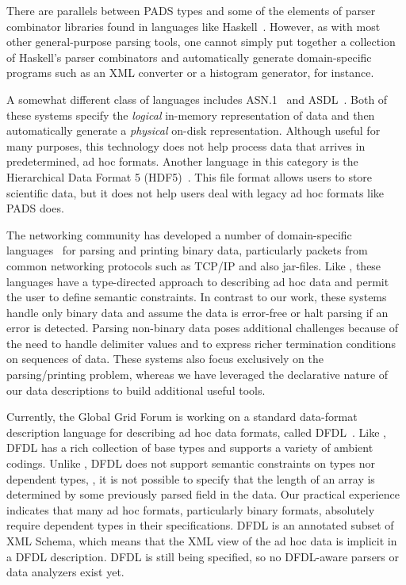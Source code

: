 \documentclass[11pt]{article}
\begin{document}
There are parallels between PADS types and some of the elements of parser
combinator libraries found in languages like
Haskell~\cite{burge:parser-combinators,hutton+:parser-combinators}. 
However, as with most other general-purpose parsing tools, one cannot
simply put together a collection of Haskell's parser combinators and
automatically generate domain-specific programs such as 
an XML converter or a histogram generator, for instance.  

A somewhat different class of languages includes
\textsc{ASN.1}~\cite{asn} and \textsc{ASDL}~\cite{asdl}. 
Both of these systems specify the {\em logical\/} in-memory representation of data
and then automatically generate a {\em physical\/} on-disk representation.
Although useful for many purposes, this technology does not help
process data that arrives in predetermined, ad hoc formats.
Another language in this category is the Hierarchical Data Format 5 
(HDF5)~\cite{hdf5}.  This file format allows users to store scientific
data, but it does not help users deal with legacy ad hoc formats like PADS does.

The networking community has developed a number of domain-specific
languages~\cite{sigcomm00,bfd,gpce02} for parsing and printing binary data, particularly packets
from common networking protocols such as \textsc{TCP/IP} and also
\java{} jar-files.  Like \pads{}, these languages have a type-directed
approach to describing ad hoc data and permit the user to define
semantic constraints.  In contrast to our work, these systems handle
only binary data and assume the data is error-free or halt parsing if
an error is detected.  Parsing non-binary data poses additional
challenges because of the need to handle delimiter values and to
express richer termination conditions on sequences of data. These
systems also focus exclusively on the parsing/printing problem,
whereas we have leveraged the declarative nature of our data
descriptions to build additional useful tools.  

Currently, the Global Grid Forum is working on a standard
data-format description language for describing ad hoc data formats,
called DFDL~\cite{dfdl-proposal,dfdl-primer}.  Like \pads{},
DFDL{} has a rich collection of base types and supports a variety of
ambient codings.  Unlike \pads{}, DFDL{} does not support semantic
constraints on types nor dependent types, \eg{}, it is not possible to
specify that the length of an array is determined by some previously parsed field in the
data.  Our practical experience indicates that many ad hoc formats,
particularly binary formats, absolutely require dependent types in their
specifications.  DFDL{} is an annotated subset of XML{} Schema, which means
that the XML{} view of the ad hoc data is implicit in a DFDL{}
description.  DFDL{} is still being specified, so no DFDL-aware
parsers or data analyzers exist yet.  
\end{document}
